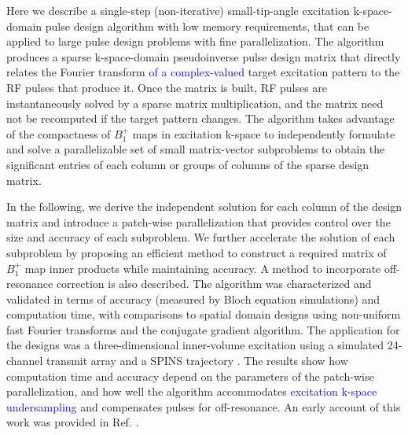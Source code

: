 \par Here we describe a single-step (non-iterative) small-tip-angle excitation k-space-domain 
pulse design algorithm with low memory requirements, 
that can be applied to large pulse design problems with fine parallelization. 
The algorithm produces a sparse k-space-domain pseudoinverse pulse design matrix 
that directly relates the Fourier transform \textcolor{blue}{of a complex-valued} target excitation pattern to the RF pulses that produce it.
Once the matrix is built, 
RF pulses are instantaneously solved by a sparse matrix multiplication,
and the matrix need not be recomputed if the target pattern changes.
The algorithm takes advantage of the compactness of $B_1^+$ maps in excitation k-space
to independently formulate and solve a parallelizable set of small matrix-vector subproblems 
to obtain the significant entries of each column or groups of columns of the sparse design matrix.  

\par In the following, 
we derive the independent solution for each column of the design matrix 
and introduce a patch-wise parallelization that provides control over the size and accuracy of each subproblem. 
We further accelerate the solution of each subproblem by proposing an efficient method to construct a required
matrix of $B_1^+$ map inner products while maintaining accuracy. 
A method to incorporate off-resonance correction is also described. 
The algorithm was characterized and validated in terms of accuracy (measured by Bloch equation simulations) 
and computation time, with comparisons to spatial domain designs using 
non-uniform fast Fourier transforms and the conjugate gradient algorithm.
The application for the designs was a three-dimensional inner-volume excitation using a simulated 24-channel transmit array
and a SPINS trajectory \cite{malik2012tailored}.
The results show how computation time and accuracy depend on the parameters of the patch-wise parallelization,
and how well the algorithm accommodates \textcolor{blue}{excitation k-space undersampling} and compensates pulses for off-resonance.
An early account of this work was provided in Ref. \cite{grissom:ismrm18}.

